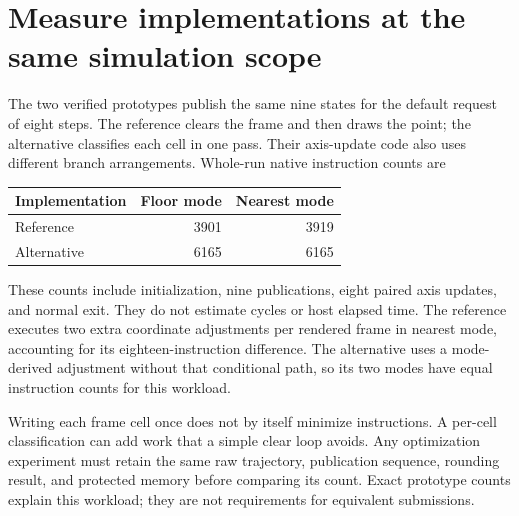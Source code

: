 \section{Measure implementations at the same simulation scope}
The two verified prototypes publish the same nine states for the default
request of eight steps. The reference clears the frame and then draws the point;
the alternative classifies each cell in one pass. Their axis-update code also
uses different branch arrangements. Whole-run native instruction counts are
\begin{longtable}{lrr}
  \toprule
  Implementation & Floor mode & Nearest mode \\
  \midrule
  Reference      & 3901       & 3919         \\
  Alternative    & 6165       & 6165         \\
  \bottomrule
\end{longtable}
These counts include initialization, nine publications, eight paired axis updates,
and normal exit. They do not estimate cycles or host elapsed time. The reference
executes two extra coordinate adjustments per rendered frame in nearest mode,
accounting for its eighteen-instruction difference. The alternative uses a
mode-derived adjustment without that conditional path, so its two modes have
equal instruction counts for this workload.

Writing each frame cell once does not by itself minimize instructions. A
per-cell classification can add work that a simple clear loop avoids. Any
optimization experiment must retain the same raw trajectory, publication sequence,
rounding result, and protected memory before comparing its count. Exact prototype
counts explain this workload; they are not requirements for equivalent submissions.
